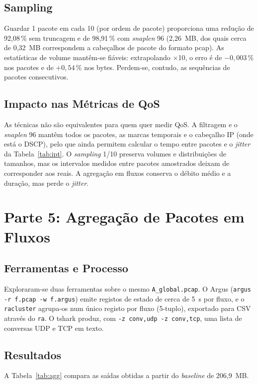 \documentclass[10.5pt,a4paper]{article}
\begin{document}
\subsection{Sampling}
Guardar 1 pacote em cada 10 (por ordem de pacote) proporciona uma redução de 92,08\,\% sem
truncagem e de 98,91\,\% com \emph{snaplen} 96 (2,26~MB, dos quais cerca de 0,32~MB
correspondem a cabeçalhos de pacote do formato pcap). As estatísticas de volume mantêm-se
fiáveis: extrapolando $\times$10, o erro é de $-0{,}003$\,\% nos pacotes e de $+0{,}54$\,\% nos
bytes. Perdem-se, contudo, as sequências de pacotes consecutivos.

\subsection{Impacto nas Métricas de QoS}
As técnicas não são equivalentes para quem quer medir QoS. A filtragem e o \emph{snaplen} 96
mantêm todos os pacotes, as marcas temporais e o cabeçalho IP (onde está o DSCP), pelo que ainda
permitem calcular o tempo entre pacotes e o \emph{jitter} da Tabela~\ref{tab:ipt}. O
\emph{sampling} 1/10 preserva volumes e distribuições de tamanhos, mas os intervalos medidos
entre pacotes amostrados deixam de corresponder aos reais. A agregação em fluxos conserva o
débito médio e a duração, mas perde o \emph{jitter}.

\section{Parte 5: Agregação de Pacotes em Fluxos}

\subsection{Ferramentas e Processo}
Exploraram-se duas ferramentas sobre o mesmo \texttt{A\_global.pcap}. O Argus
(\texttt{argus -r f.pcap -w f.argus}) emite registos de estado de cerca de 5~s por fluxo, e o
\texttt{racluster} agrupa-os num único registo por fluxo (5-tuplo), exportado para CSV através do
\texttt{ra}. O tshark produz, com \texttt{-z conv,udp -z conv,tcp}, uma lista de conversas UDP e
TCP em texto.

\subsection{Resultados}
A Tabela~\ref{tab:agg} compara as saídas obtidas a partir do \emph{baseline} de 206,9~MB.
\end{document}

